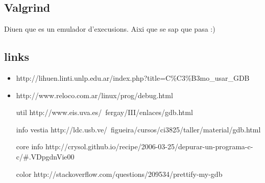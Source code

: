 \documentclass[a4paper,10pt]{article}
\begin{document}
\subsection{Valgrind}
Diuen que es un emulador d'execusions. Aixi que se sap que pasa :)
\subsection{links}
\begin{itemize}
\item http://lihuen.linti.unlp.edu.ar/index.php?title=C\%C3\%B3mo\_usar\_GDB
\item http://www.reloco.com.ar/linux/prog/debug.html
\item[util] http://www.eis.uva.es/~fergay/III/enlaces/gdb.html
\item[info vestia] http://ldc.usb.ve/~figueira/cursos/ci3825/taller/material/gdb.html
\item[core info] http://crysol.github.io/recipe/2006-03-25/depurar-un-programa-c-c/\#.VDpgdnVie00
\item[color] http://stackoverflow.com/questions/209534/prettify-my-gdb
\end{itemize}
\end{document}
